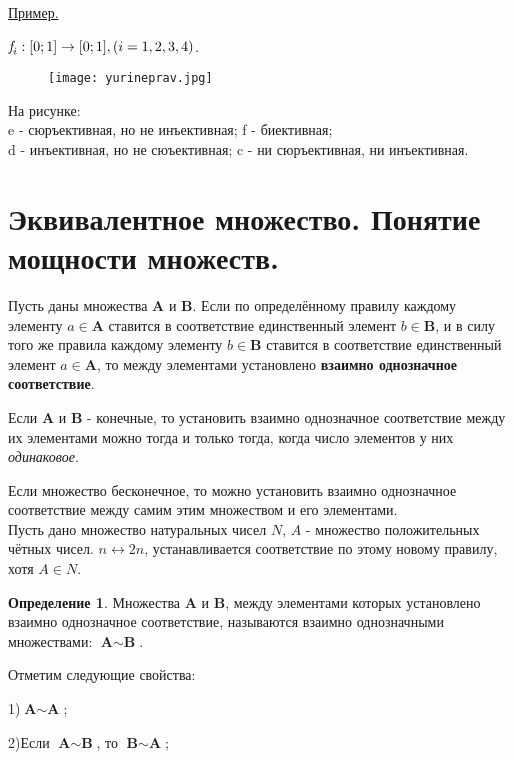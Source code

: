 \documentclass[12pt, a4paper, oneside]{article}
\theoremstyle{plain} %
\theoremstyle{definition}
\newtheorem*{definition}{Определение}  %
\newcommand{\indef}[1]{\textbf{ \color{dark_red} #1}}
\begin{document}
\underline{Пример.}

$\emph{f}_i: [0;1] \rightarrow [0;1], (i = 1,2,3,4)$.
\begin{figure}[h!]
    \centering
    \texttt{[image: yurineprav.jpg]}
    \label{fig:my_label}
\end{figure}

На рисунке:\\
e - сюръективная, но не инъективная;
f - биективная;\\
d - инъективная, но не сюъективная;
c - ни сюръективная, ни инъективная.

\section{Эквивалентное множество. Понятие мощности множеств.}

Пусть даны множества \textbf{A} и \textbf{B}. Если по определённому правилу каждому элементу $a \in \textbf{A}$ ставится в соответствие единственный элемент $b \in \textbf{B}$, и в силу того же правила каждому элементу $b \in \textbf{B}$ ставится в соответствие единственный элемент $a \in \textbf{A}$, то между элементами установлено \indef{взаимно однозначное соответствие}.\par

Если \textbf{A} и \textbf{B} - конечные, то установить взаимно однозначное соответствие между их элементами можно тогда и только тогда, когда число элементов у них \emph{одинаковое}.\par 

Если множество бесконечное, то можно установить взаимно однозначное соответствие между самим этим множеством и его элементами.\\
Пусть дано множество натуральных чисел $N$, $A$ - множество положительных чётных чисел. $n \leftrightarrow 2n$, устанавливается соответствие по этому новому правилу, хотя $A \in N$.

\begin{definition}
Множества \textbf{A} и \textbf{B}, между элементами которых установлено взаимно однозначное соответствие, называются взаимно однозначными множествами: $\textbf{A} \sim \textbf{B}$. 
\end{definition}

Отметим следующие свойства: 


1)$\textbf{A} \sim \textbf{A}$;


2)Если $\textbf{A} \sim \textbf{B}$, то $\textbf{B} \sim \textbf{A}$;
\end{document}
